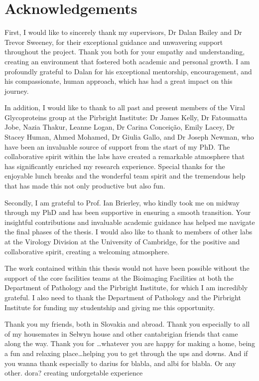 \chapter{Acknowledgements}
First, I would like to sincerely thank my supervisors, Dr Dalan Bailey and Dr Trevor Sweeney, for their exceptional guidance and unwavering support throughout the project. Thank you both for your empathy and understanding, creating an environment that fostered both academic and personal growth. I am profoundly grateful to Dalan for his exceptional mentorship, encouragement, and his compassionate, human approach, which has had a great impact on this journey. 

In addition, I would like to thank to all past and present members of the Viral Glycoproteins group at the Pirbright Institute: Dr James Kelly, Dr Fatoumatta Jobe, Nazia Thakur, Leanne Logan, Dr Carina Conceição, Emily Lacey, Dr Stacey Human, Ahmed Mohamed, Dr Giulia Gallo, and  Dr Joseph Newman, who have been an invaluable source of support from the start of my PhD. The collaborative spirit within the labs have created a remarkable atmosphere that has significantly enriched my research experience. Special thanks for the enjoyable lunch breaks and the wonderful team spirit and the tremendous help that has made this not only productive but also fun.

Secondly, I am grateful to Prof. Ian Brierley, who kindly took me on midway through my PhD and has been supportive in ensuring a smooth transition. Your insightful contributions and invaluable academic guidance has helped me navigate the final phases of the thesis. I would also like to thank to members	of other labs at the Virology Division at the University of Cambridge, for the positive and collaborative spirit, creating a welcoming atmosphere.

The work contained within this thesis would not have been possible without the support of the core facilities teams at the Bioimaging Facilities at both the Department of Pathology and the Pirbright Institute, for which I am incredibly grateful. I also need to thank the Department of Pathology and the Pirbright Institute for funding my studentship and giving me this opportunity.

Thank you my friends, both in Slovakia and abroad. Thank you especially to all of my housemates in Selwyn house and other cantabrigian friends that came along the way. Thank you for …whatever you are happy for making a home, being a fun and relaxing place…helping you to get through the ups and downs. And if you wanna thank especially to darius for blabla, and albi for blabla. Or any other. dora? creating unforgetable experience

